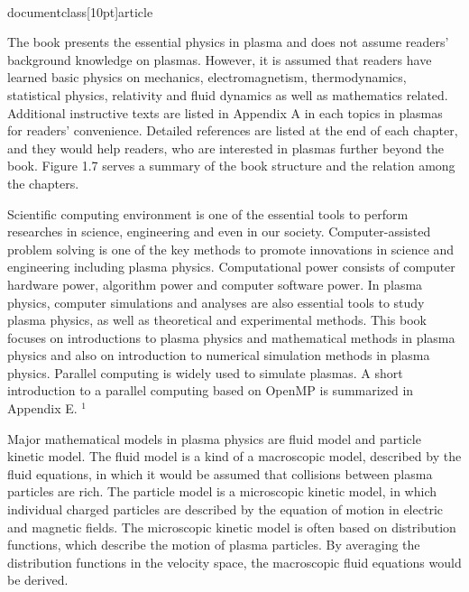 \\documentclass[10pt]{article}
\begin{document}
The book presents the essential physics in plasma and does not assume readers' background knowledge on plasmas. However, it is assumed that readers have learned basic physics on mechanics, electromagnetism, thermodynamics, statistical physics, relativity and fluid dynamics as well as mathematics related. Additional instructive texts are listed in Appendix A in each topics in plasmas for readers' convenience. Detailed references are listed at the end of each chapter, and they would help readers, who are interested in plasmas further beyond the book. Figure 1.7 serves a summary of the book structure and the relation among the chapters.

Scientific computing environment is one of the essential tools to perform researches in science, engineering and even in our society. Computer-assisted problem solving is one of the key methods to promote innovations in science and engineering including plasma physics. Computational power consists of computer hardware power, algorithm power and computer software power. In plasma physics, computer simulations and analyses are also essential tools to study plasma physics, as well as theoretical and experimental methods. This book focuses on introductions to plasma physics and mathematical methods in plasma physics and also on introduction to numerical simulation methods in plasma physics. Parallel computing is
widely used to simulate plasmas. A short introduction to a parallel computing based on OpenMP is summarized in Appendix E. ${ }^{1}$

Major mathematical models in plasma physics are fluid model and particle kinetic model. The fluid model is a kind of a macroscopic model, described by the fluid equations, in which it would be assumed that collisions between plasma particles are rich. The particle model is a microscopic kinetic model, in which individual charged particles are described by the equation of motion in electric and magnetic fields. The microscopic kinetic model is often based on distribution functions, which describe the motion of plasma particles. By averaging the distribution functions in the velocity space, the macroscopic fluid equations would be derived.
\end{document}

